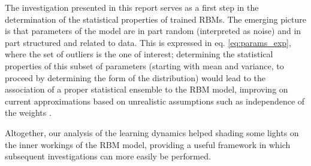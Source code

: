 \documentclass{revtex4-1}
\begin{document}
The investigation presented in this report serves as a first step in the determination of the statistical properties of trained RBMs. The emerging picture is that parameters of the model are in part random (interpreted as noise) and in part structured and related to data. This is expressed in eq. \eqref{eq:params_exp}, where the set of outliers is the one of interest; determining the statistical properties of this subset of parameters (starting with mean and variance, to proceed by determining the form of the distribution) would lead to the association of a proper statistical ensemble to the RBM model, improving on current approximations based on unrealistic assumptions such as independence of the weights \cite{monasson}.

Altogether, our analysis of the learning dynamics helped shading some lights on the inner workings of the RBM model, providing a useful framework in which subsequent investigations can more easily be performed.


\end{document}
